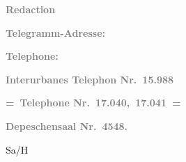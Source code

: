 \pstart
           \textcolor{gray}{\textbf{\textbf{Redaction}}}\pend
           
\pstart
           \textcolor{gray}{\textbf{Telegramm-Adresse: \so{,}{ }}}\pend
           
\pstart
           \textcolor{gray}{\textbf{\textbf{Telephone:}}}\pend
           
\pstart
           \textcolor{gray}{\textbf{Interurbanes Telephon Nr. 15.988}}\pend
           
\pstart
           \textcolor{gray}{\textbf{= Telephone Nr. 17.040, 17.041 =}}\pend
           
\pstart
           \textcolor{gray}{\textbf{Depeschensaal Nr. 4548.}}\pend
           
\pstart
           Sa/H\pend
           
